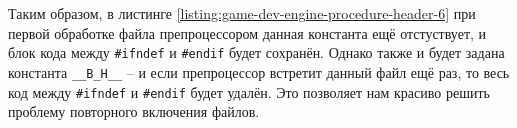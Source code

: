 \documentclass[../sparc.tex]{subfiles}
\begin{document}
Таким образом, в листинге \ref{listing:game-dev-engine-procedure-header-6} при
первой обработке файла препроцессором данная константа ещё отстуствует, и блок
кода между \texttt{#ifndef} и \texttt{#endif} будет сохранён.
Однако также и будет задана константа \texttt{__B_H__} -- и если
препроцессор встретит данный файл ещё раз, то весь код между
\texttt{#ifndef} и \texttt{#endif} будет удалён.  Это
позволяет нам красиво решить проблему повторного включения файлов.
\end{document}
